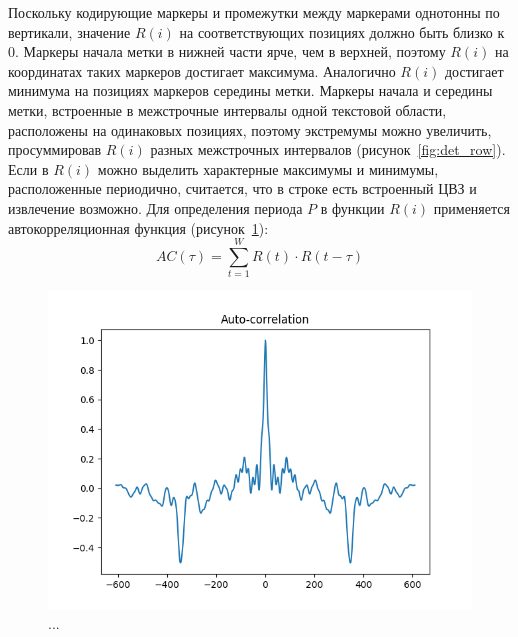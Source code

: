 \documentclass[12pt,a4paper]{article}
\begin{document}
Поскольку кодирующие маркеры и промежутки между маркерами однотонны по вертикали, значение $R(i)$ на соответствующих позициях должно быть близко к 0.
Маркеры начала метки в нижней части ярче, чем в верхней, поэтому $R(i)$ на координатах таких маркеров достигает максимума.
Аналогично $R(i)$ достигает минимума на позициях маркеров середины метки.
Маркеры начала и середины метки, встроенные в межстрочные интервалы одной текстовой области, расположены на одинаковых позициях, поэтому экстремумы можно увеличить, просуммировав $R(i)$ разных межстрочных интервалов (рисунок~\ref{fig:det_row}).
Если в $R(i)$ можно выделить характерные максимумы и минимумы, расположенные периодично, считается, что в строке есть встроенный ЦВЗ и извлечение возможно.
Для определения периода $P$ в функции $R(i)$ применяется автокорреляционная функция (рисунок~\ref{fig:auto_correlation}):
$$AC(\tau)=\sum_{t=1}^{W} R(t)\cdot R(t-\tau)$$
\begin{figure}[h]
	
	\centering
	
	\includegraphics[width=1\linewidth]{auto_correlation.png}
	
	\caption{...}
	
	\label{fig:auto_correlation}
	
\end{figure}
\end{document}
